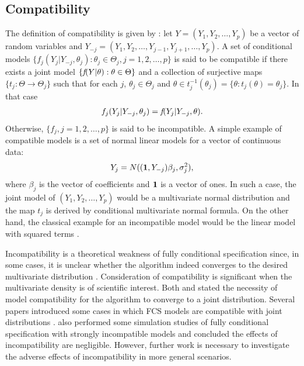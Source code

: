 	\subsection{Compatibility} 
	The definition of compatibility is given by \citet{liu2014stationary}: let $Y = (Y_1, Y_2, \dots, Y_p)$ be a vector of random variables and $Y_{-j} = (Y_1, Y_2, \dots, Y_{j-1}, Y_{j+1}, \dots, Y_{p})$. A set of conditional models $\{f_{j}(Y_j|Y_{-j}, \theta_{j}) : \theta_{j} \in \Theta_{j}, j = 1, 2, \dots, p\}$ is said to be compatible if there exists a joint model $\{\emph{f}(Y|\theta) : \theta \in \Theta\}$ and a collection of surjective maps $\{t_{j} : \Theta \to \Theta_{j}\}$ such that for each $j$, $\theta_{j} \in \Theta_{j}$ and $\theta \in t_{j}^{-1}(\theta_{j}) = \{\theta : t_{j}(\theta) = \theta_{j}\}$. In that case 
	\begin{gather*}
		f_{j}(Y_j|Y_{-j}, \theta_{j}) = \emph{f}(Y_j|Y_{-j}, \theta).
	\end{gather*}
	Otherwise, $\{f_{j}, j = 1, 2, \dots, p\}$ is said to be incompatible.
	A simple example of compatible models is a set of normal linear models for a vector of continuous data: 
	\begin{gather*}
		Y_j = N((\textbf1, Y_{-j})\beta_{j}, \sigma_{j}^2), 
	\end{gather*}
	where $\beta_{j}$ is the vector of coefficients and $\textbf1$ is a vector of ones. In such a case, the joint model of $(Y_1, Y_2, \dots, Y_p)$ would be a multivariate normal distribution and the map $t_j$ is derived by conditional multivariate normal formula. On the other hand, the classical example for an incompatible model would be the linear model with squared terms \citep{liu2014stationary, bartlett2015multiple}.
	
	Incompatibility is a theoretical weakness of fully conditional specification since, in some cases, it is unclear whether the algorithm indeed converges to the desired multivariate distribution \citep{arnold1989compatible, arnold2004compatibility, heckerman2000dependency, van2006fully}. Consideration of compatibility is significant when the multivariate density is of scientific interest. Both \citet{hughes2014joint} and \citet{liu2014stationary} stated the necessity of model compatibility for the algorithm to converge to a joint distribution. Several papers introduced some cases in which FCS models are compatible with joint distributions \citep{Buuren2018, raghunathan2001multivariate}. \citet{van2006fully} also performed some simulation studies of fully conditional specification with strongly incompatible models and concluded the effects of incompatibility are negligible. However, further work is necessary to investigate the adverse effects of incompatibility in more general scenarios. 
	
